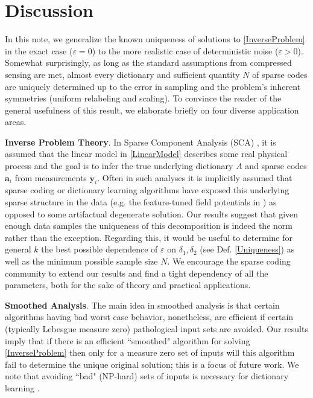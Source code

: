 \documentclass[journal, twocolumn]{IEEEtran}
\begin{document}
\section{Discussion}

In this note, we generalize the known uniqueness of solutions to \eqref{InverseProblem} in the exact case ($\varepsilon = 0$) to the more realistic case of deterministic noise ($\varepsilon > 0$).  Somewhat surprisingly, as long as the standard assumptions from compressed sensing are met, almost every dictionary and sufficient quantity $N$ of sparse codes are uniquely determined up to the error in sampling and the problem's inherent symmetries (uniform relabeling and scaling). To convince the reader of the general usefulness of this result, we elaborate briefly on four diverse application areas.

\textbf{Inverse Problem Theory}.  
In Sparse Component Analysis (SCA) \cite{Georgiev05}, it is assumed that the linear model in \eqref{LinearModel} describes some real physical process and the goal is to infer the true underlying dictionary $A$ and sparse codes $\mathbf{a}_i$ from measurements $\mathbf{y}_i$. Often in such analyses it is implicitly assumed that sparse coding or dictionary learning algorithms have exposed this underlying sparse structure in the data (e.g. the feature-tuned field potentials in \cite{Agarwal14}) as opposed to some artifactual degenerate solution. Our results suggest that given enough data samples the uniqueness of this decomposition is indeed the norm rather than the exception. Regarding this, it would be useful to determine for general $k$ the best possible dependence of $\varepsilon$ on $\delta_1, \delta_2$ (see Def. \ref{Uniqueness}) as well as the minimum possible sample size $N$. We encourage the sparse coding community to extend our results and find a tight dependency of all the parameters, both for the sake of theory and practical applications.

\textbf{Smoothed Analysis}.
The main idea in smoothed analysis \cite{Spielman04} is that certain algorithms having bad worst case behavior, nonetheless, are efficient if certain (typically Lebesgue measure zero) pathological input sets are avoided. Our results imply that if there is an efficient ``smoothed" algorithm for solving \eqref{InverseProblem} then only for a measure zero set of inputs will this algorithm fail to determine the unique original solution; this is a focus of future work. We note that avoiding ``bad" (NP-hard) sets of inputs is necessary for dictionary learning \cite{Razaviyayn15, Tillmann15}.
\end{document}
